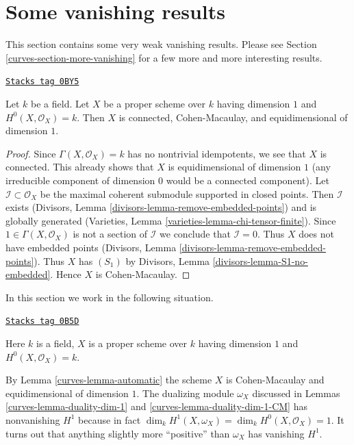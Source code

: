 \section{Some vanishing results}
\label{curves-section-vanishing}
This section contains some very weak vanishing results.
Please see Section \ref{curves-section-more-vanishing} for
a few more and more interesting results.

\begin{lemma}[Automatic]
\label{curves-lemma-automatic}
\href{https://stacks.math.columbia.edu/tag/0BY5}{\texttt{Stacks tag 0BY5}}

Let $k$ be a field. Let $X$ be a proper scheme over $k$ having dimension $1$
and $H^0(X, \mathcal{O}_X) = k$. Then $X$ is connected, Cohen-Macaulay,
and equidimensional of dimension $1$.
\end{lemma}

\begin{proof}
Since $\Gamma(X, \mathcal{O}_X) = k$ has no nontrivial idempotents,
we see that $X$ is connected. This already shows that $X$ is
equidimensional of dimension $1$ (any irreducible component
of dimension $0$ would be a connected component).
Let $\mathcal{I} \subset \mathcal{O}_X$
be the maximal coherent submodule supported in closed points.
Then $\mathcal{I}$ exists
(Divisors, Lemma \ref{divisors-lemma-remove-embedded-points})
and is globally generated
(Varieties, Lemma \ref{varieties-lemma-chi-tensor-finite}).
Since $1 \in \Gamma(X, \mathcal{O}_X)$ is not a section
of $\mathcal{I}$ we conclude that $\mathcal{I} = 0$.
Thus $X$ does not have embedded points
(Divisors, Lemma \ref{divisors-lemma-remove-embedded-points}).
Thus $X$ has $(S_1)$ by
Divisors, Lemma \ref{divisors-lemma-S1-no-embedded}.
Hence $X$ is Cohen-Macaulay.
\end{proof}

In this section we work in the following situation.

\begin{definition}
\label{curves-situation-Cohen-Macaulay-curve}
\href{https://stacks.math.columbia.edu/tag/0B5D}{\texttt{Stacks tag 0B5D}}

Here $k$ is a field, $X$ is a proper scheme over $k$ having dimension $1$
and $H^0(X, \mathcal{O}_X) = k$.
\end{definition}

By Lemma \ref{curves-lemma-automatic} the scheme $X$ is Cohen-Macaulay and
equidimensional of dimension $1$. The dualizing module $\omega_X$
discussed in Lemmas \ref{curves-lemma-duality-dim-1} and
\ref{curves-lemma-duality-dim-1-CM} has nonvanishing $H^1$ because in fact
$\dim_k H^1(X, \omega_X) = \dim_k H^0(X, \mathcal{O}_X) = 1$. It turns out
that anything slightly more ``positive'' than $\omega_X$ has vanishing $H^1$.

